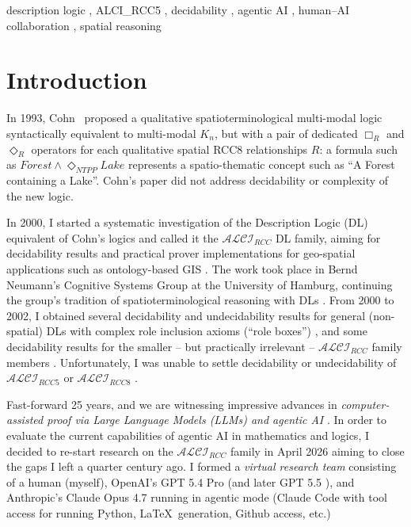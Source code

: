 \documentclass[
]{ceurart}
\theoremstyle{definition}
\newcommand{\ALCIRCC}[1]{\ensuremath{\mathcal{ALCI}_{\mathit{RCC#1}}}}
\begin{document}
\begin{keywords}
  description logic \sep
  ALCI\_RCC5 \sep
  decidability \sep
  agentic AI \sep
  human--AI collaboration \sep
  spatial reasoning
\end{keywords}

\maketitle

\section{Introduction}
\label{sec:ea-intro}

In 1993, Cohn~\cite{Cohn1993} proposed a qualitative
spatioterminological multi-modal logic syntactically equivalent to
multi-modal $K_n$, but with a pair of dedicated $\Box_R$ and
$\Diamond_R$ operators for each qualitative spatial RCC8
relationships $R$: a formula such as $Forest \wedge \Diamond_{NTPP}
Lake$ represents a spatio-thematic concept such as ``A Forest
containing a Lake''. Cohn's paper did not address decidability or
complexity of the new logic.

In 2000, I started a systematic investigation of the Description
Logic (DL) equivalent of Cohn's logics and called it the $\ALCIRCC{}$
DL family, aiming for decidability results and practical prover
implementations for geo-spatial applications such as ontology-based
GIS \cite{Wessel2003KRDB}. The work took place in Bernd Neumann's
Cognitive Systems Group at the University of Hamburg, continuing the
group's tradition of spatioterminological reasoning with DLs
\cite{HaarslevMoellerSchroder1994,SchroderNeumann1996,
  HaarslevWessel1996GenEd, HaarslevMoeller1997SBox, MoellerWessel1999,
  HaarslevLutzMoeller1998, HaarslevLutzMoeller1999, Wessel2003KRDB}.
From 2000 to 2002, I obtained several decidability and undecidability
results for general (non-spatial) DLs with complex role inclusion
axioms (``role boxes'') \cite{Wessel2000RA,
  Wessel2000SG,Wessel2001,Wessel2001RA}, and some decidability results
for the smaller -- but practically irrelevant -- $\ALCIRCC{}$ family
members \cite{Wessel2002, Wessel2003}. Unfortunately, I was unable to
settle decidability or undecidability of $\ALCIRCC{5}$ or
$\ALCIRCC{8}$ \cite{Wessel2003}.

Fast-forward 25 years, and we are witnessing impressive advances in
\emph{computer-assisted proof via Large Language Models (LLMs) and
agentic AI} \cite{TaoKlowden2026, Knuth2026ClaudesCycles}. In order to
evaluate the current capabilities of agentic AI in mathematics and
logics, I decided to re-start research on the $\ALCIRCC{}$ family in
April 2026 aiming to close the gaps I left a quarter century ago. I
formed a \emph{virtual research team} consisting of a human (myself),
OpenAI's GPT 5.4 Pro \cite{GPT54Pro} (and later GPT 5.5
\cite{GPT55Repaired}), and Anthropic's Claude Opus 4.7
\cite{ClaudeOpus47} running in agentic mode (Claude Code with tool
access for running Python, \LaTeX\ generation, Github access, etc.)
\end{document}
